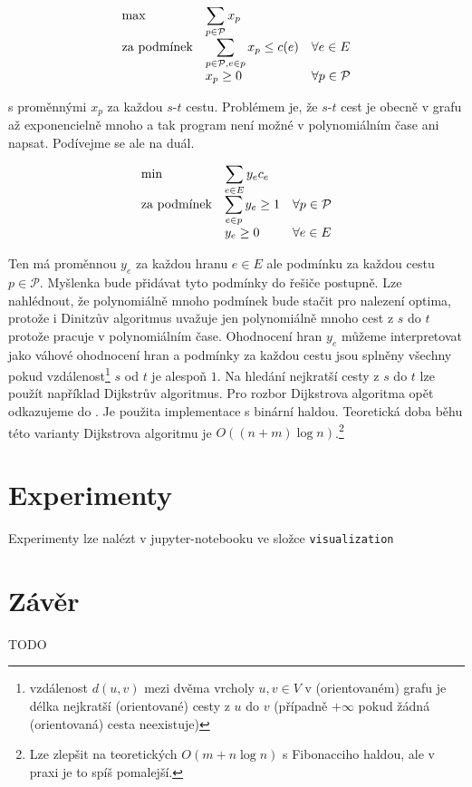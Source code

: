 \documentclass{article}
\theoremstyle{plain}
\theoremstyle{definition}
\begin{document}
\begin{equation}\label{exp_lp}
\begin{array}{ll@{}ll}
\text{max} & \displaystyle\sum_{p\in\mathcal{P}}x_p  &\\
\text{za podmínek}& \displaystyle\sum_{p\in\mathcal{P},e\in p} x_p \leq c(e)  & & \forall e \in E\\
& x_p\geq 0 & & \forall p \in \mathcal{P}
\end{array}
\end{equation}

s proměnnými $x_p$ za každou $s$-$t$ cestu. Problémem je, že $s$-$t$ cest je obecně v grafu až exponencielně mnoho a tak program není možné v polynomiálním čase ani napsat. Podívejme se ale na duál.

\begin{equation}\label{dual_exp}
\begin{array}{ll@{}ll}
\text{min} & \displaystyle\sum_{e\in E}y_ec_e &\\
\text{za podmínek}& \displaystyle \sum_{e\in p}y_e \geq 1 & & \forall p\in\mathcal{P}\\
&y_e \geq 0& & \forall e \in E
\end{array}
\end{equation}

Ten má proměnnou $y_e$ za každou hranu $e\in E$ ale podmínku za každou cestu $p\in \mathcal{P}$. Myšlenka bude přidávat tyto podmínky do řešiče postupně. Lze nahlédnout, že polynomiálně mnoho podmínek bude stačit pro nalezení optima, protože i Dinitzův algoritmus uvažuje jen polynomiálně mnoho cest z $s$ do $t$ protože pracuje v polynomiálním čase. Ohodnocení hran $y_e$ můžeme interpretovat jako váhové ohodnocení hran a podmínky za každou cestu jsou splněny všechny pokud vzdálenost\footnote{vzdálenost $d(u,v)$ mezi dvěma vrcholy $u,v\in V$ v (orientovaném) grafu je délka nejkratší (orientované) cesty z $u$ do $v$ (případně $+\infty$ pokud žádná (orientovaná) cesta neexistuje)} $s$ od $t$ je alespoň $1$. Na hledání nejkratší cesty z $s$ do $t$ lze použít například Dijkstrův algoritmus. Pro rozbor Dijkstrova algoritma opět odkazujeme do \cite{labyrint}. Je použita implementace s binární haldou. Teoretická doba běhu této varianty Dijkstrova algoritmu je $O((n+m)\log n)$.\footnote{Lze zlepšit na teoretických $O(m+n\log n)$ s Fibonacciho haldou, ale v praxi je to spíš pomalejší.}

\section{Experimenty}
Experimenty lze nalézt v jupyter-notebooku ve složce {\tt visualization}

\section{Závěr}
TODO



\end{document}
